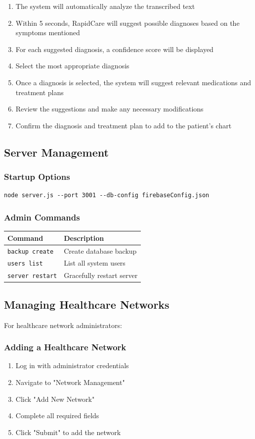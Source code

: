 \documentclass[12pt, titlepage]{article}
\begin{document}
\begin{enumerate}
\item The system will automatically analyze the transcribed text
\item Within 5 seconds, RapidCare will suggest possible diagnoses based on the symptoms mentioned
\item For each suggested diagnosis, a confidence score will be displayed
\item Select the most appropriate diagnosis
\item Once a diagnosis is selected, the system will suggest relevant medications and treatment plans
\item Review the suggestions and make any necessary modifications
\item Confirm the diagnosis and treatment plan to add to the patient's chart
\end{enumerate}

\subsection{Server Management}
\subsubsection{Startup Options}
\begin{verbatim}
node server.js --port 3001 --db-config firebaseConfig.json
\end{verbatim}

\subsubsection{Admin Commands}
\begin{tabularx}{\textwidth}{lX}
\toprule
\textbf{Command} & \textbf{Description} \\
\midrule
\texttt{backup create} & Create database backup \\
\texttt{users list} & List all system users \\
\texttt{server restart} & Gracefully restart server \\
\bottomrule
\end{tabularx}

\subsection{Managing Healthcare Networks}
For healthcare network administrators:

\subsubsection{Adding a Healthcare Network}
\begin{enumerate}
\item Log in with administrator credentials
\item Navigate to "Network Management"
\item Click "Add New Network"
\item Complete all required fields
\item Click "Submit" to add the network
\end{enumerate}
\end{document}
